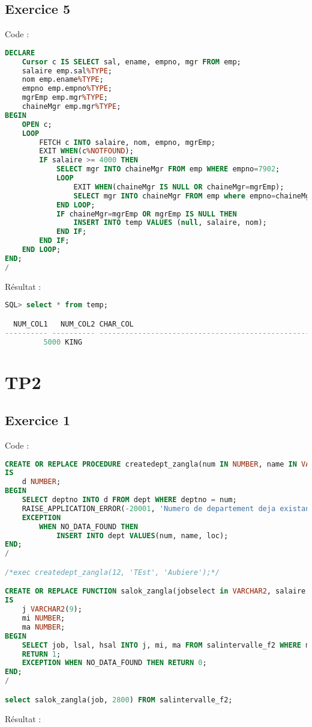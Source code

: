 \documentclass{article}
\begin{document}
\subsection{Exercice 5}
Code :
\begin{lstlisting}[language=SQL,
    deletekeywords={char},
    morekeywords={DECLARE, LOOP, TYPE, FOR, IF, IS, OPEN, FETCH, DBMS_OUTPUT, PUT_LINE}]
DECLARE
	Cursor c IS SELECT sal, ename, empno, mgr FROM emp;
	salaire emp.sal%TYPE;
	nom emp.ename%TYPE;
	empno emp.empno%TYPE;
	mgrEmp emp.mgr%TYPE;
	chaineMgr emp.mgr%TYPE;
BEGIN
	OPEN c;
	LOOP
		FETCH c INTO salaire, nom, empno, mgrEmp;
		EXIT WHEN(c%NOTFOUND);
		IF salaire >= 4000 THEN
			SELECT mgr INTO chaineMgr FROM emp WHERE empno=7902;
			LOOP
				EXIT WHEN(chaineMgr IS NULL OR chaineMgr=mgrEmp);
				SELECT mgr INTO chaineMgr FROM emp where empno=chaineMgr;
			END LOOP;
			IF chaineMgr=mgrEmp OR mgrEmp IS NULL THEN
				INSERT INTO temp VALUES (null, salaire, nom);
			END IF;
		END IF;
	END LOOP;
END;
/
\end{lstlisting}

Résultat :
\begin{lstlisting}[language=SQL,
    morekeywords={DECLARE, LOOP, TYPE, FOR, IF, IS, OPEN, FETCH, DBMS_OUTPUT, PUT_LINE}]
SQL> select * from temp;

  NUM_COL1   NUM_COL2 CHAR_COL
---------- ---------- -------------------------------------------------------
		 5000 KING
\end{lstlisting}

\newpage
\section{TP2}
\subsection{Exercice 1}
Code :
\begin{lstlisting}[language=SQL,
    deletekeywords={char},
    morekeywords={DECLARE, LOOP, TYPE, FOR, IF, IS, OPEN, FETCH, DBMS_OUTPUT, PUT_LINE}]
CREATE OR REPLACE PROCEDURE createdept_zangla(num IN NUMBER, name IN VARCHAR2, loc IN VARCHAR2)
IS
    d NUMBER;
BEGIN
    SELECT deptno INTO d FROM dept WHERE deptno = num;
    RAISE_APPLICATION_ERROR(-20001, 'Numero de departement deja existant');
    EXCEPTION 
        WHEN NO_DATA_FOUND THEN
            INSERT INTO dept VALUES(num, name, loc);
END;
/

/*exec createdept_zangla(12, 'TEst', 'Aubiere');*/

CREATE OR REPLACE FUNCTION salok_zangla(jobselect in VARCHAR2, salaire in NUMBER) RETURN NUMBER 
IS
    j VARCHAR2(9);
    mi NUMBER;
    ma NUMBER;
BEGIN
    SELECT job, lsal, hsal INTO j, mi, ma FROM salintervalle_f2 WHERE mi <= salaire AND ma >= salaire;
    RETURN 1; 
    EXCEPTION WHEN NO_DATA_FOUND THEN RETURN 0;
END;
/

select salok_zangla(job, 2800) FROM salintervalle_f2;
\end{lstlisting}

Résultat :
\begin{lstlisting}[language=SQL,
    morekeywords={DECLARE, LOOP, TYPE, FOR, IF, IS, OPEN, FETCH, DBMS_OUTPUT, PUT_LINE}]
\end{lstlisting}
\end{document}

